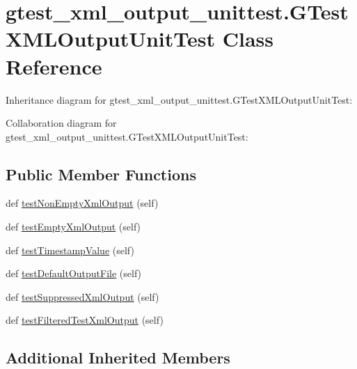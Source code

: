 \hypertarget{classgtest__xml__output__unittest_1_1_g_test_x_m_l_output_unit_test}{}\section{gtest\+\_\+xml\+\_\+output\+\_\+unittest.\+G\+Test\+X\+M\+L\+Output\+Unit\+Test Class Reference}
\label{classgtest__xml__output__unittest_1_1_g_test_x_m_l_output_unit_test}


Inheritance diagram for gtest\+\_\+xml\+\_\+output\+\_\+unittest.\+G\+Test\+X\+M\+L\+Output\+Unit\+Test\+:


Collaboration diagram for gtest\+\_\+xml\+\_\+output\+\_\+unittest.\+G\+Test\+X\+M\+L\+Output\+Unit\+Test\+:
\subsection*{Public Member Functions}
\begin{DoxyCompactItemize}
\item 
def \hyperlink{classgtest__xml__output__unittest_1_1_g_test_x_m_l_output_unit_test_a310c136c1eb2b421f57651a7d358b17a}{test\+Non\+Empty\+Xml\+Output} (self)
\item 
def \hyperlink{classgtest__xml__output__unittest_1_1_g_test_x_m_l_output_unit_test_a9602f91fe2e9d1e09171a032e94a5619}{test\+Empty\+Xml\+Output} (self)
\item 
def \hyperlink{classgtest__xml__output__unittest_1_1_g_test_x_m_l_output_unit_test_a828521a7ae57f650e1e9ca4beb34336a}{test\+Timestamp\+Value} (self)
\item 
def \hyperlink{classgtest__xml__output__unittest_1_1_g_test_x_m_l_output_unit_test_a01ca66e14468028e5c4eb809987113cf}{test\+Default\+Output\+File} (self)
\item 
def \hyperlink{classgtest__xml__output__unittest_1_1_g_test_x_m_l_output_unit_test_ac6df46d6831892e4c14dbdfae0049618}{test\+Suppressed\+Xml\+Output} (self)
\item 
def \hyperlink{classgtest__xml__output__unittest_1_1_g_test_x_m_l_output_unit_test_a572b6d49e8f4d646ebdadcced3d260ef}{test\+Filtered\+Test\+Xml\+Output} (self)
\end{DoxyCompactItemize}
\subsection*{Additional Inherited Members}


